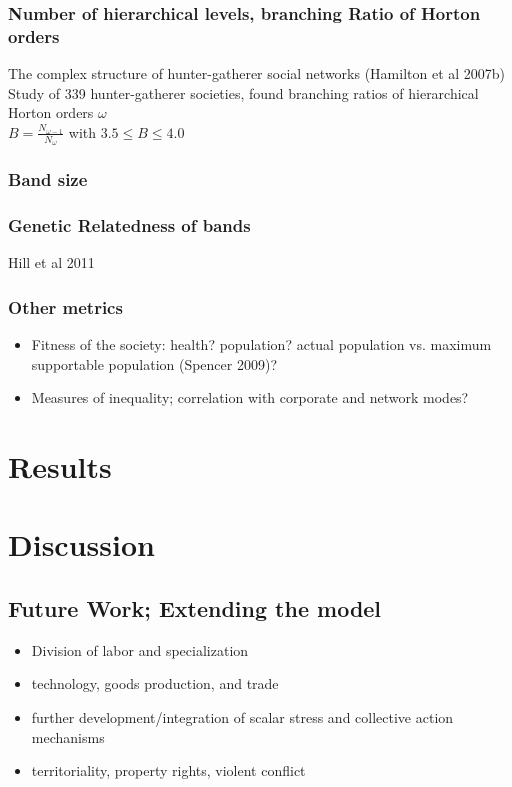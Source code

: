 \documentclass[11pt,oneside,a4paper,onecolumn]{article}
\begin{document}
\subsubsection{Number of hierarchical levels, branching Ratio of Horton orders}
The complex structure of hunter-gatherer social networks (Hamilton et al 2007b)\\
Study of 339 hunter-gatherer societies, found branching ratios of hierarchical Horton orders $\omega$\\

$B = \frac{N_{\omega-1}}{N_{\omega}}$ with $ 3.5 \leq B \leq 4.0$

\subsubsection{Band size}

\subsubsection{Genetic Relatedness of bands}
Hill et al 2011

\subsubsection{Other metrics}
\begin{itemize}
	\item Fitness of the society:  health?  population?  actual population vs. maximum supportable population (Spencer 2009)?

	\item Measures of inequality; correlation with corporate and network modes?
\end{itemize}

\section{Results}

\section{Discussion}

\subsection{Future Work; Extending the model}

\begin{itemize}
	\item Division of labor and specialization
	
	\item technology, goods production, and trade
	
	\item further development/integration of scalar stress and collective action mechanisms
	
	\item territoriality, property rights, violent conflict
\end{itemize}
\end{document}
